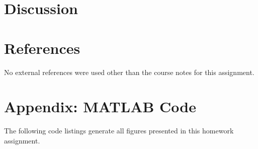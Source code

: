 \documentclass[11pt]{article}
\begin{document}
\section{Discussion} %


\section{References} %

No external references were used other than the course notes for this assignment.

\section*{Appendix: MATLAB Code} %

The following code listings generate all figures presented in this homework assignment.


\end{document}
